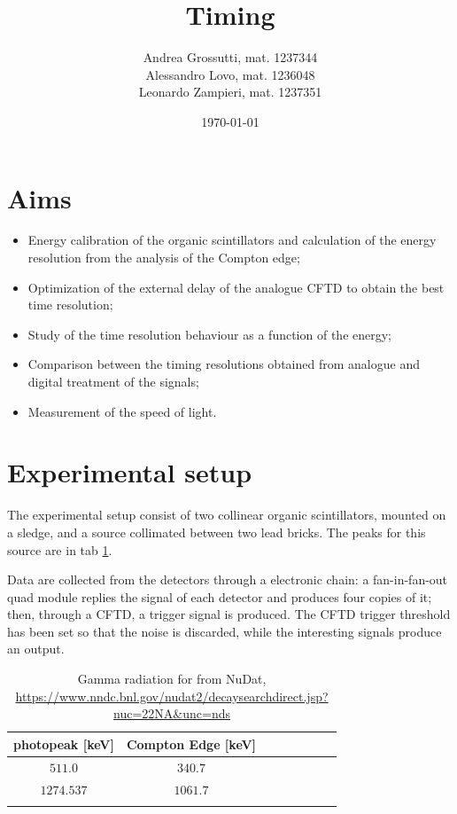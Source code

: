 \documentclass[11pt,a4 paper]{article}
\title{Timing}
\author{Andrea Grossutti, mat. 1237344\\Alessandro Lovo, mat. 1236048\\Leonardo Zampieri, mat. 1237351}
\date{\today}
\begin{document}
\maketitle

\section{Aims}
\begin{itemize}[noitemsep]
    \item Energy calibration of the organic scintillators and calculation of the energy resolution from the analysis of the Compton edge;
    \item Optimization of the external delay of the analogue CFTD to obtain the best time resolution;
    \item Study of the time resolution behaviour as a function of the energy;
    \item Comparison between the timing resolutions obtained from analogue and digital treatment of the signals;
    \item Measurement of the speed of light.
\end{itemize}

\section{Experimental setup}
The experimental setup consist of two collinear organic scintillators, mounted on a sledge, and a  source collimated between two lead bricks. The peaks for this source are in tab \ref{tab:gammavalue}.

Data are collected from the detectors through a electronic chain: a fan-in-fan-out quad module replies the signal of each detector and produces four copies of it; then, through a CFTD, a trigger signal is produced. The CFTD trigger threshold has been set so that the noise is discarded, while the interesting signals produce an output.

\begin{table}[H]
    \centering
    \begin{tabular}{cccccccc}
        \toprule
        photopeak [keV] & Compton Edge [keV] \\
        \midrule
        $511.0$ & $340.7$\\
        $1274.537$ & $1061.7$ \\
        \bottomrule\vspace{0.01cm}
    \end{tabular}
    \caption{Gamma radiation for  from NuDat, \url{https://www.nndc.bnl.gov/nudat2/decaysearchdirect.jsp?nuc=22NA\&unc=nds}}
    \label{tab:gammavalue}
\end{table}
\end{document}
